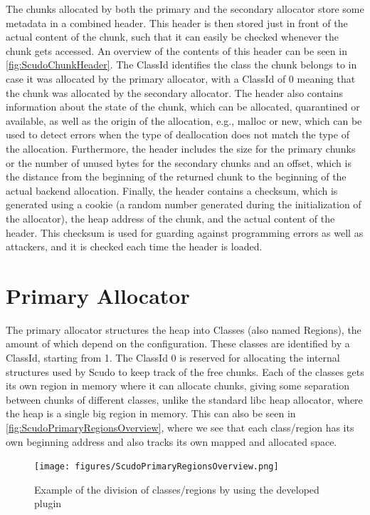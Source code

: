 \documentclass[a4paper,11pt,oneside]{report}
\begin{document}
The chunks allocated by both the primary and the secondary allocator store some
metadata in a combined header. This header is then stored just in front of the
actual content of the chunk, such that it can easily be checked whenever the
chunk gets accessed. An overview of the contents of this header can be seen
in \autoref{fig:ScudoChunkHeader}. The ClassId identifies the class the chunk
belongs to in case it was allocated by the primary allocator, with a ClassId
of 0 meaning that the chunk was allocated by the secondary allocator. The
header also contains information about the state of the chunk, which can be
allocated, quarantined or available, as well as the origin of the allocation,
e.g., malloc or new, which can be used to detect errors when the type of
deallocation does not match the type of the allocation. Furthermore, the
header includes the size for the primary chunks or the number of unused bytes
for the secondary chunks and an offset, which is the distance from the beginning
of the returned chunk to the beginning of the actual backend allocation.
Finally, the header contains a checksum, which is generated using a cookie (a
random number generated during the initialization of the allocator), the heap
address of the chunk, and the actual content of the header. This checksum is
used for guarding against programming errors as well as attackers, and it is
checked each time the header is loaded.

\section{Primary Allocator}

The primary allocator structures the heap into Classes (also named Regions), the
amount of which depend on the configuration. These classes are identified by a
ClassId, starting from 1. The ClassId 0 is reserved for allocating the internal
structures used by Scudo to keep track of the free chunks.
Each of the classes gets its own region in memory where it can allocate chunks,
giving some separation between chunks of different classes, unlike the standard
libc heap allocator, where the heap is a single big region in memory. This can
also be seen in \autoref{fig:ScudoPrimaryRegionsOverview}, where we see that
each class/region has its own beginning address and also tracks its own mapped
and allocated space.

\begin{figure}[h!]
  \centering
  \texttt{[image: figures/ScudoPrimaryRegionsOverview.png]}
  \caption{Example of the division of classes/regions by using the developed plugin}
  \label{fig:ScudoPrimaryRegionsOverview}
\end{figure}
\end{document}
